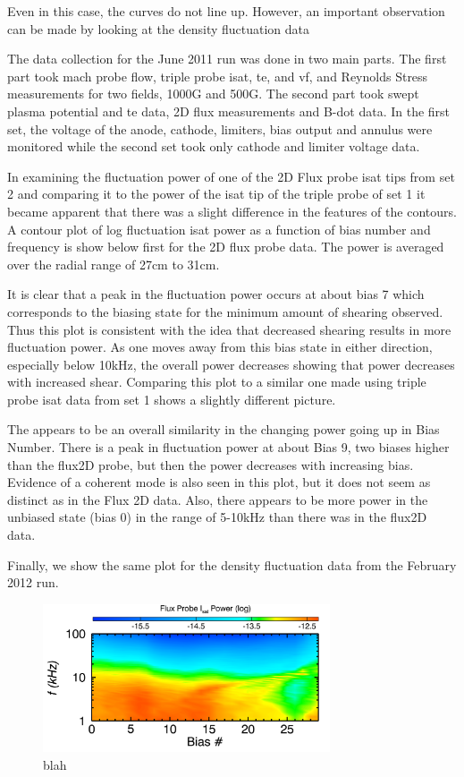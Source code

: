 \documentclass[aip,pop,amsmath,amssymb,preprint,superscriptaddress]{revtex4-1} %
\begin{document}
Even in this case, the curves do not line up. However, an important observation can be made by looking at the density fluctuation data

The data collection for the June 2011 run was done in two main parts. The first part took mach probe flow, triple probe isat, te, and vf, and Reynolds Stress measurements for two fields, 1000G and 500G. The second part took swept plasma potential and te data, 2D flux measurements and B-dot data. In the first set, the voltage of the anode, cathode, limiters, bias output and annulus were monitored while the second set took only cathode and limiter voltage data.

In examining the fluctuation power of one of the 2D Flux probe isat tips from set 2 and comparing it to the power of the isat tip of the triple probe of set 1 it became apparent that there was a slight difference in the features of the contours. A contour plot of log fluctuation isat power as a function of bias number and frequency is show below first for the 2D flux probe data. The power is averaged over the radial range of 27cm to 31cm.

It is clear that a peak in the fluctuation power occurs at about bias 7 which corresponds to the biasing state for the minimum amount of shearing observed. Thus this plot is consistent with the idea that decreased shearing results in more fluctuation power. As one moves away from this bias state in either direction, especially below 10kHz, the overall power decreases showing that power decreases with increased shear.  Comparing this plot to a similar one made using triple probe isat data from set 1 shows a slightly different picture.

The appears to be an overall similarity in the changing power going up in Bias Number. There is a peak in fluctuation power at about Bias 9, two biases higher than the flux2D probe,  but then the power decreases with increasing bias. Evidence of a coherent mode is also seen in this plot, but it does not seem as distinct as in the Flux 2D data.  Also, there appears to be more power in the unbiased state (bias 0) in the range of 5-10kHz than there was in the flux2D data.

Finally, we show the same plot for the density fluctuation data from the February 2012 run. 

\begin{figure}[!htbp]
\centerline{
\includegraphics[width=8.5cm]{flux_flucs}}
\caption{\label{fig:flux_flucs} blah}
\end{figure}
\end{document}
